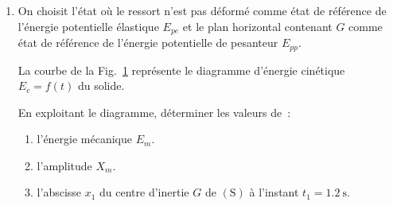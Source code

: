 \begin{enumerate}[resume]
    \item On choisit l'état où le ressort n'est pas déformé comme état de
          référence de l'énergie potentielle élastique $E_{pe}$ et le plan
          horizontal contenant $G$ comme état de référence de l'énergie
          potentielle de pesanteur $E_{pp}$.

          \begin{minipage}[t][][t]{0.56\linewidth}
              La courbe de la Fig.~\ref{fig:Ec_de_t} représente le diagramme
              d'énergie cinétique $E_{c}=f(t)$ du solide.

              En exploitant le diagramme, déterminer les valeurs de~:
              \begin{enumerate}
                  \item l'énergie mécanique $E_{m}$.
                  \item l'amplitude $X_{m}$.
                  \item l'abscisse $x_{1}$ du centre d'inertie $G$ de
                        $\mathrm{(S)}$ à l'instant ${t_{1}=\qty{1,2}{\second}}$.
              \end{enumerate}
          \end{minipage}
          \hfill
          \begin{minipage}[t][][t]{0.42\linewidth}
              \begin{figure}[H]
                 \centering
                 \caption{}
                 \label{fig:Ec_de_t}
              \end{figure}   
          \end{minipage}
\end{enumerate}

